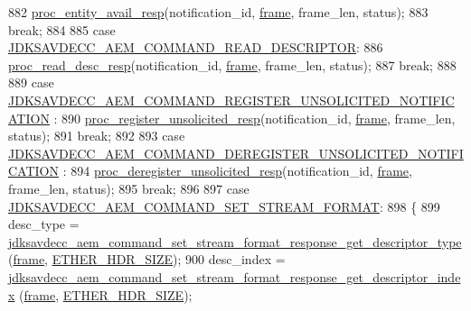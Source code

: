 \begin{DoxyCode}
{{882         \hyperlink{classavdecc__lib_1_1end__station__imp_aac9243417afd8dbcfb91d061128d5aec}{proc\_entity\_avail\_resp}(notification\_id, \hyperlink{gst__avb__playbin_8c_ac8e710e0b5e994c0545d75d69868c6f0}{frame}, frame\_len, status);
883         \textcolor{keywordflow}{break};
884 
885     \textcolor{keywordflow}{case} \hyperlink{group__command_gaa6a32a290cbec71466b571590b05fd00}{JDKSAVDECC\_AEM\_COMMAND\_READ\_DESCRIPTOR}:
886         \hyperlink{classavdecc__lib_1_1end__station__imp_aec709f7fbab1e54a17c113219c690f5f}{proc\_read\_desc\_resp}(notification\_id, \hyperlink{gst__avb__playbin_8c_ac8e710e0b5e994c0545d75d69868c6f0}{frame}, frame\_len, status);
887         \textcolor{keywordflow}{break};
888 
889     \textcolor{keywordflow}{case} \hyperlink{group__command_ga3e96622fb21f8a15740b8a3c6536dd00}{JDKSAVDECC\_AEM\_COMMAND\_REGISTER\_UNSOLICITED\_NOTIFICATION}
      :
890         \hyperlink{classavdecc__lib_1_1end__station__imp_a151a0d143ccb4f721fb4e89bb25ab049}{proc\_register\_unsolicited\_resp}(notification\_id, 
      \hyperlink{gst__avb__playbin_8c_ac8e710e0b5e994c0545d75d69868c6f0}{frame}, frame\_len, status);
891         \textcolor{keywordflow}{break};
892 
893     \textcolor{keywordflow}{case} \hyperlink{group__command_gaf60a3f35dcf29df8b09a17e9278952ae}{JDKSAVDECC\_AEM\_COMMAND\_DEREGISTER\_UNSOLICITED\_NOTIFICATION}
      :
894         \hyperlink{classavdecc__lib_1_1end__station__imp_a2427c30c802be85e96e3b36489dd1353}{proc\_deregister\_unsolicited\_resp}(notification\_id, 
      \hyperlink{gst__avb__playbin_8c_ac8e710e0b5e994c0545d75d69868c6f0}{frame}, frame\_len, status);
895         \textcolor{keywordflow}{break};
896 
897     \textcolor{keywordflow}{case} \hyperlink{group__command_ga5a4c1db8bb66e83da7bcdff6a4e2c7e7}{JDKSAVDECC\_AEM\_COMMAND\_SET\_STREAM\_FORMAT}:
898     \{
899         desc\_type = 
      \hyperlink{group__command__set__stream__format__response_ga236db9fb302ab75ca2403531040254c8}{jdksavdecc\_aem\_command\_set\_stream\_format\_response\_get\_descriptor\_type}
      (\hyperlink{gst__avb__playbin_8c_ac8e710e0b5e994c0545d75d69868c6f0}{frame}, \hyperlink{namespaceavdecc__lib_a6c827b1a0d973e18119c5e3da518e65ca9512ad9b34302ba7048d88197e0a2dc0}{ETHER\_HDR\_SIZE});
900         desc\_index = 
      \hyperlink{group__command__set__stream__format__response_gad537666f50834335936b9c8147d02110}{jdksavdecc\_aem\_command\_set\_stream\_format\_response\_get\_descriptor\_index}
      (\hyperlink{gst__avb__playbin_8c_ac8e710e0b5e994c0545d75d69868c6f0}{frame}, \hyperlink{namespaceavdecc__lib_a6c827b1a0d973e18119c5e3da518e65ca9512ad9b34302ba7048d88197e0a2dc0}{ETHER\_HDR\_SIZE});
}}
\end{DoxyCode}
